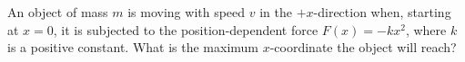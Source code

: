 An object of mass $m$ is moving with speed $v$ in the $+x$-direction
when, starting at $x=0$, it is subjected to the position-dependent
force $F(x) = - k x^2$, where $k$ is a positive constant. What is the
maximum $x$-coordinate the object will reach?\answercheck
